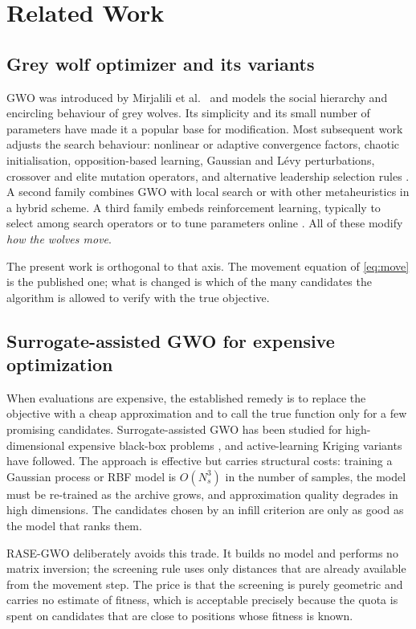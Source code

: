 \section{Related Work}
\label{sec:related}

\subsection{Grey wolf optimizer and its variants}

GWO was introduced by Mirjalili et al.\ \cite{mirjalili2014gwo} and models the
social hierarchy and encircling behaviour of grey wolves. Its simplicity and its
small number of parameters have made it a popular base for modification. Most
subsequent work adjusts the search behaviour: nonlinear or adaptive convergence
factors, chaotic initialisation, opposition-based learning, Gaussian and
L\'evy perturbations, crossover and elite mutation operators, and alternative
leadership selection rules \cite{...}. A second family combines GWO with local
search or with other metaheuristics in a hybrid scheme. A third family embeds
reinforcement learning, typically to select among search operators or to tune
parameters online \cite{...}. All of these modify \emph{how the wolves move}.

The present work is orthogonal to that axis. The movement equation of
\eqref{eq:move} is the published one; what is changed is which of the many
candidates the algorithm is allowed to verify with the true objective.

\subsection{Surrogate-assisted GWO for expensive optimization}

When evaluations are expensive, the established remedy is to replace the
objective with a cheap approximation and to call the true function only for a
few promising candidates. Surrogate-assisted GWO has been studied for
high-dimensional expensive black-box problems \cite{sagwo2020}, and
active-learning Kriging variants have followed. The approach is effective but
carries structural costs: training a Gaussian process or RBF model is
$O(N_s^3)$ in the number of samples, the model must be re-trained as the archive
grows, and approximation quality degrades in high dimensions. The candidates
chosen by an infill criterion are only as good as the model that ranks them.

RASE-GWO deliberately avoids this trade. It builds no model and performs no
matrix inversion; the screening rule uses only distances that are already
available from the movement step. The price is that the screening is purely
geometric and carries no estimate of fitness, which is acceptable precisely
because the quota is spent on candidates that are close to positions whose
fitness is known.

